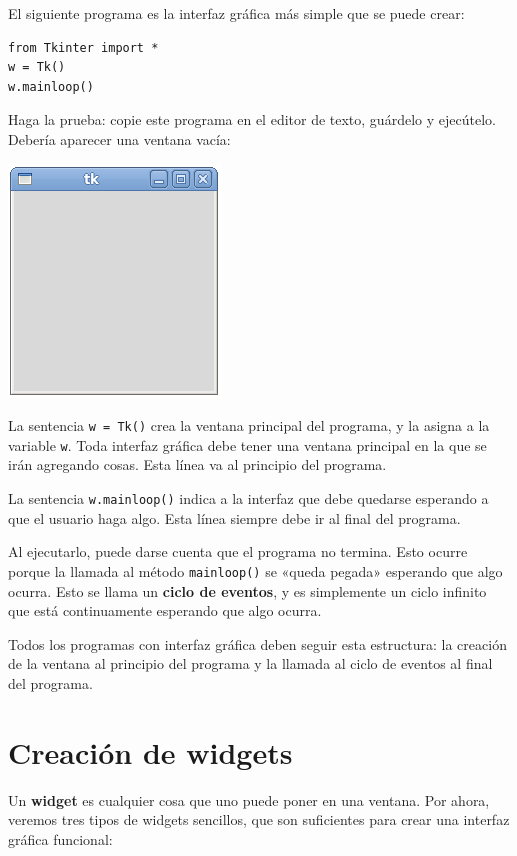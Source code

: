 El siguiente programa es la interfaz gráfica más simple que se puede
crear:

\begin{lstlisting}
from Tkinter import *
w = Tk()
w.mainloop()
\end{lstlisting}

Haga la prueba: copie este programa en el editor de texto, guárdelo y
ejecútelo. Debería aparecer una ventana vacía:

\includegraphics{../diapos/programas/tkinter/capturas/01.png}

La sentencia \lstinline!w = Tk()! crea la ventana principal del
programa, y la asigna a la variable \lstinline!w!. Toda interfaz gráfica
debe tener una ventana principal en la que se irán agregando cosas. Esta
línea va al principio del programa.

La sentencia \lstinline!w.mainloop()! indica a la interfaz que debe
quedarse esperando a que el usuario haga algo. Esta línea siempre debe
ir al final del programa.

Al ejecutarlo, puede darse cuenta que el programa no termina. Esto
ocurre porque la llamada al método \lstinline!mainloop()! se «queda
pegada» esperando que algo ocurra. Esto se llama un \textbf{ciclo de
eventos}, y es simplemente un ciclo infinito que está continuamente
esperando que algo ocurra.

Todos los programas con interfaz gráfica deben seguir esta estructura:
la creación de la ventana al principio del programa y la llamada al
ciclo de eventos al final del programa.

\section{Creación de widgets}

Un \textbf{widget} es cualquier cosa que uno puede poner en una ventana.
Por ahora, veremos tres tipos de widgets sencillos, que son suficientes
para crear una interfaz gráfica funcional:

